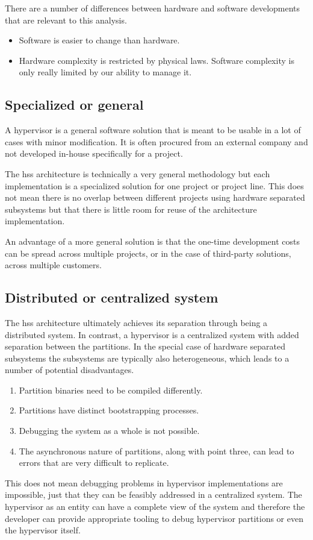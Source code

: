 There are a number of differences between hardware and software developments that are relevant to this analysis. 
\begin{itemize}
\item Software is easier to change than hardware. 
\item Hardware complexity is restricted by physical laws. Software complexity is only really limited by our ability to manage it.
\end{itemize}
\subsection{Specialized or general}
A hypervisor is a general software solution that is meant to be usable in a lot of cases with minor modification. It is often procured from an external company and not developed in-house specifically for a project.

The \acrshort{hss} architecture is technically a very general methodology but each implementation is a specialized solution for one project or project line. This does not mean there is no overlap between different projects using hardware separated subsystems but that there is little room for reuse of the architecture implementation.

An advantage of a more general solution is that the one-time development costs can be spread across multiple projects, or in the case of third-party solutions, across multiple customers.   

\subsection{Distributed or centralized system} \label{distributed-or-centralized}
The \acrshort{hss} architecture ultimately achieves its separation through being a distributed system. In contrast, a hypervisor is a centralized system with added separation between the partitions. In the special case of hardware separated subsystems the subsystems are typically also heterogeneous, which leads to a number of potential disadvantages.
\begin{enumerate}
\item Partition binaries need to be compiled differently.
\item Partitions have distinct bootstrapping processes.
\item Debugging the system as a whole is not possible.
\item The asynchronous nature of partitions, along with point three, can lead to errors that are very difficult to replicate.
\end{enumerate}
This does not mean debugging problems in hypervisor implementations are impossible, just that they can be feasibly addressed in a centralized system. The hypervisor as an entity can have a complete view of the system and therefore the developer can provide appropriate tooling to debug hypervisor partitions or even the hypervisor itself.

